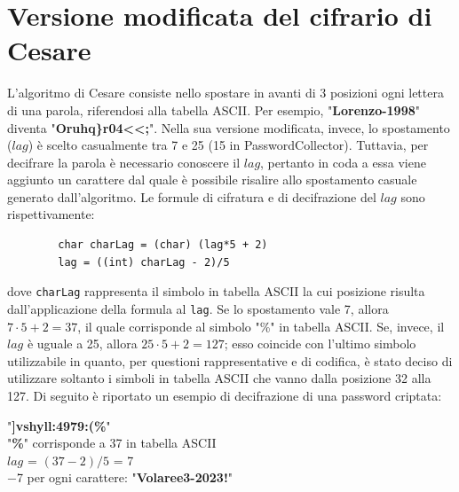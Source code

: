 \documentclass[a4paper, 12pt, one column, aas_macros]{article}
\begin{document}
	\section{Versione modificata del cifrario di Cesare}
	L'algoritmo di Cesare consiste nello spostare in avanti di \num{3} posizioni ogni lettera di una parola, riferendosi alla tabella ASCII. Per esempio, "\textbf{Lorenzo-1998}" diventa "\textbf{Oruhq\}r04<<;}". Nella sua versione modificata, invece, lo spostamento ($lag$) è scelto casualmente tra \num{7} e \num{25} (\num{15} in PasswordCollector). Tuttavia, per decifrare la parola è necessario conoscere il $lag$, pertanto in coda a essa viene aggiunto un carattere dal quale è possibile risalire allo spostamento casuale generato dall'algoritmo. Le formule di cifratura e di decifrazione del $lag$ sono rispettivamente:
	\begin{verbatim}
		char charLag = (char) (lag*5 + 2)
		lag = ((int) charLag - 2)/5
	\end{verbatim}
	dove \verb|charLag| rappresenta il simbolo in tabella ASCII la cui posizione risulta dall'applicazione della formula al \verb|lag|. Se lo spostamento vale \num{7}, allora $7\cdot5 + 2 = 37$, il quale corrisponde al simbolo "\%" in tabella ASCII. Se, invece, il $lag$ è uguale a \num{25}, allora $25\cdot5 + 2 = 127$; esso coincide con l'ultimo simbolo utilizzabile in quanto, per questioni rappresentative e di codifica, è stato deciso di utilizzare soltanto i simboli in tabella ASCII che vanno dalla posizione \num{32} alla \num{127}. Di seguito è riportato un esempio di decifrazione di una password criptata:
	\begin{center}
		"\textbf{]vshyll:4979:(\%}"\\
		"\textbf{\%}" corrisponde a \num{37} in tabella ASCII\\
		$lag$ = $(37-2)/5$ = 7\\
		\num{-7} per ogni carattere: "\textbf{Volaree3-2023!}"
	\end{center}
	
\end{document}
